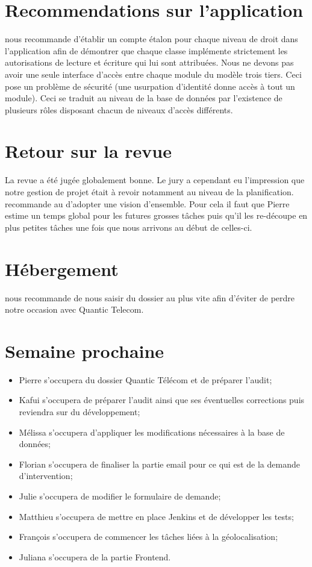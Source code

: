 \documentclass [a4paper] {article}
\begin{document}
\section{Recommendations sur l'application}
\nomTuteurPedago{} nous recommande d'établir un compte étalon pour chaque niveau de droit dans l'application afin de démontrer que chaque classe implémente strictement les autorisations de lecture et écriture qui lui sont attribuées. 
Nous ne devons pas avoir une seule interface d'accès entre chaque module du modèle trois tiers. Ceci pose un problème de sécurité (une usurpation d'identité donne accès à tout un module).
Ceci se traduit au niveau de la base de données par l'existence de plusieurs rôles disposant chacun de niveaux d'accès différents.

\section{Retour sur la revue}
La revue a été jugée globalement bonne. Le jury a cependant eu l'impression que notre gestion de projet était à revoir notamment au niveau de la planification.
\nomTuteurPedago{} recommande au \CP{} d'adopter une vision d'ensemble. Pour cela il faut que Pierre estime un temps global pour les futures grosses tâches puis qu'il les re-découpe en plus petites tâches une fois que nous arrivons au début de celles-ci.


\section{Hébergement}
\nomTuteurPedago{} nous recommande de nous saisir du dossier au plus vite afin d'éviter de perdre notre occasion avec Quantic Telecom.

\section{Semaine prochaine}
\begin{itemize}
\item Pierre s'occupera du dossier Quantic Télécom et de préparer l'audit;
\item Kafui s'occupera de préparer l'audit ainsi que ses éventuelles corrections puis reviendra sur du développement;
\item Mélissa s'occupera d'appliquer les modifications nécessaires à la base de données;
\item Florian s'occupera de finaliser la partie email pour ce qui est de la demande d'intervention;
\item Julie s'occupera de modifier le formulaire de demande;
\item Matthieu s'occupera de mettre en place Jenkins et de développer les tests;
\item François s'occupera de commencer les tâches liées à la géolocalisation;
\item Juliana s'occupera de la partie Frontend.
\end{itemize}
\newpage
\end{document}
